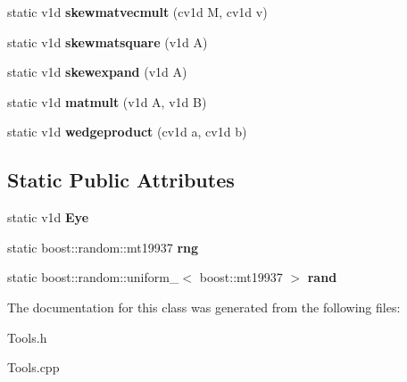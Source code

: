 \begin{DoxyCompactItemize}
\item 
\mbox{\label{classTools_af17c58fb352a999211937e226355cadd}} 
static v1d {\bfseries skewmatvecmult} (cv1d M, cv1d v)
\item 
\mbox{\label{classTools_ab18bae57ed72653d51921cef609428d9}} 
static v1d {\bfseries skewmatsquare} (v1d A)
\item 
\mbox{\label{classTools_a14752734db04632f0c67e30c6437508c}} 
static v1d {\bfseries skewexpand} (v1d A)
\item 
\mbox{\label{classTools_aefa4b33f73f4690a9325877dcaaf39c9}} 
static v1d {\bfseries matmult} (v1d A, v1d B)
\item 
\mbox{\label{classTools_aa82d79ce38ef21f1fadc3c873153237c}} 
static v1d {\bfseries wedgeproduct} (cv1d a, cv1d b)
\end{DoxyCompactItemize}
\subsection*{Static Public Attributes}
\begin{DoxyCompactItemize}
\item 
\mbox{\label{classTools_acc7958f1d304ff265aa7b03e0f22cda3}} 
static v1d {\bfseries Eye}
\item 
\mbox{\label{classTools_a7bf5220ccceb3fe23a6d41a022ed1660}} 
static boost\+::random\+::mt19937 {\bfseries rng}
\item 
\mbox{\label{classTools_a59ae41e7043665863d64ea65f87fa708}} 
static boost\+::random\+::uniform\+\_$<$ boost\+::mt19937 $>$ {\bfseries rand}
\end{DoxyCompactItemize}


The documentation for this class was generated from the following files\+:\begin{DoxyCompactItemize}
\item 
Tools.\+h\item 
Tools.\+cpp\end{DoxyCompactItemize}
